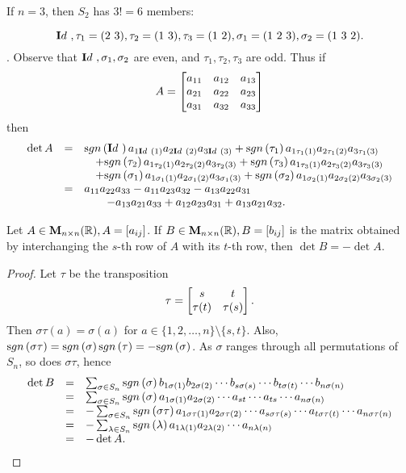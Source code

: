 \begin{exa}
If $n = 3$, then  $S_2$ has $3! = 6$   members:

$$\idefun, \tau_1 = (2 \ 3), \tau_2 = (1 \ 3), \tau_3 = (1 \ 2), \sigma_1 =  (1 \ 2 \ 3), \sigma_2 =  (1 \ 3 \ 2). $$.
Observe that ${\mathbf Id\ }, \sigma_1, \sigma_2$ are even, and $\tau_1,
\tau_2, \tau_3$ are odd. Thus if $$A = \begin{bmatrix}a_{11} &
a_{12} & a_{13} \cr a_{21} & a_{22} & a_{23}\cr a_{31} & a_{32} &
a_{33}\cr
\end{bmatrix}$$then
 $$\begin{array}{lll}\det A  &  =  & \sgn{\idefun}a_{1\idefun (1)}a_{2\idefun (2)}a_{3\idefun (3)} + \sgn{\tau_1}a_{1\tau_1 (1)}a_{2\tau_1 (2)}a_{3\tau_1
 (3)}\\
& & \quad + \sgn{\tau_2}a_{1\tau_2 (1)}a_{2\tau_2 (2)}a_{3\tau_2
(3)} + \sgn{\tau_3}a_{1\tau_3 (1)}a_{2\tau_3 (2)}a_{3\tau_3 (3)}
\\
& & \quad + \sgn{\sigma_1}a_{1\sigma_1 (1)}a_{2\sigma_1
(2)}a_{3\sigma_1 (3)} + \sgn{\sigma_2}a_{1\sigma_2
(1)}a_{2\sigma_2 (2)}a_{3\sigma_2 (3)}
\\
&  = &  a_{11}a_{22}a_{33} - a_{11}a_{23}a_{32}  - a_{13}a_{22}a_{31}\\
& & \qquad - a_{13}a_{21}a_{33}  + a_{12}a_{23}a_{31} + a_{13}a_{21}a_{32}. \\
\end{array}
$$
\end{exa}
\begin{thm}\label{thm:alternating_determinants}
Let $A \in {\mathbf M}_{n\times n}( \mathbb{R}), A = [a_{ij}]$. If $B \in
{\mathbf M}_{n\times n}( \mathbb{R}), B = [b_{ij}]$ is the matrix obtained by
interchanging  the $s$-th row of $A$ with its $t$-th row, then $\det
B = -\det A$.
\end{thm}
\begin{proof}
Let $\tau$ be the transposition
$$\tau =
\begin{bmatrix} s & t \cr \tau (t) & \tau (s) \cr
\end{bmatrix}.
$$Then $\sigma\tau (a) = \sigma (a)$ for $a\in\{1, 2, \ldots , n\}\setminus
\{s,t\}$. Also, $\sgn{\sigma\tau} = \sgn{\sigma}\sgn{\tau} =
-\sgn{\sigma}$.  As $\sigma$ ranges through all permutations of
$S_n$, so does
 $\sigma\tau$, hence
$$\begin{array}{lll}\det B & = & \sum _{\sigma\in S_n}\sgn{\sigma} b_{1\sigma (1)}b_{2\sigma (2)}\cdots
b_{s\sigma (s)}\cdots b_{t\sigma (t)} \cdots b_{n\sigma (n)} \\ &
= &  \sum _{\sigma\in S_n}\sgn{\sigma} a_{1\sigma (1)}a_{2\sigma
(2)}\cdots a_{st}\cdots a_{ts} \cdots a_{n\sigma (n)} \\
& = & -\sum _{\sigma\in S_n}\sgn{\sigma\tau }a_{1\sigma\tau
(1)}a_{2\sigma\tau (2)}\cdots a_{s\sigma\tau
(s)}\cdots a_{t\sigma\tau  (t)} \cdots a_{n\sigma\tau (n)} \\
& = & -\sum _{\lambda \in S_n} \sgn{\lambda } a_{1\lambda
(1)}a_{2\lambda  (2)} \cdots a_{n\lambda  (n)} \\
& = & -\det A.
 \end{array} $$
\end{proof}
